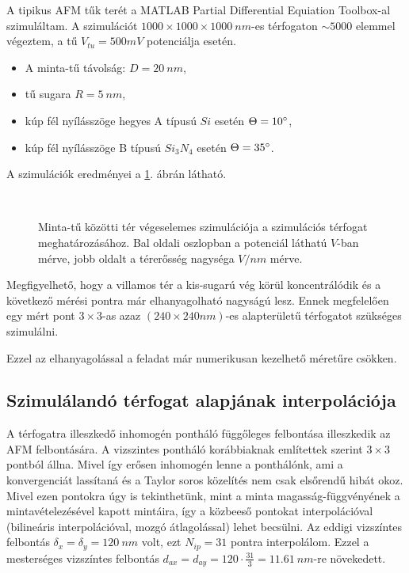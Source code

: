 	A tipikus AFM tűk terét a MATLAB Partial Differential Equiation Toolbox-al szimuláltam.
	A szimulációt $1000\times 1000\times 1000\ nm$-es térfogaton $\sim5000$ elemmel végeztem, a tű $V_{tu} = 500mV$ potenciálja
	esetén.
	\begin{itemize}
	  \item A minta-tű távolság: $D=20\ nm$,
	  \item tű sugara $R=5\ nm$,
	  \item kúp fél nyílásszöge hegyes A típusú $Si$ esetén $\Theta=10\degree$,
	  \item kúp fél nyílásszöge B típusú $Si_3N_4$ esetén $\Theta=35\degree$.
	\end{itemize}
	A szimulációk eredményei a \ref{fig:pde_sim}. ábrán látható.
	\begin{figure}[!h]
		\hfil
		\\
		\hfil
		
		\caption{
			Minta-tű közötti tér végeselemes szimulációja a szimulációs térfogat meghatározásához.
			Bal oldali oszlopban a potenciál láthatú $V$-ban mérve, jobb oldalt a térerősség nagységa $V/nm$ mérve.
		}
		\label{fig:pde_sim}
	\end{figure}
		
	Megfigyelhető, hogy a villamos tér a kis-sugarú vég körül koncentrálódik és a következő mérési pontra már elhanyagolható nagyságú
	lesz. Ennek megfelelően egy mért pont $3\times3$-as azaz $(240\times240 nm)$-es alapterületű térfogatot szükséges szimulálni. 
	\begin{center}
		Ezzel az elhanyagolással a feladat már numerikusan kezelhető méretűre csökken.
	\end{center}
	
\subsection{Szimulálandó térfogat alapjának interpolációja}	
	A térfogatra illeszkedő inhomogén pontháló függőleges felbontása illeszkedik az AFM felbontására.
	A vizszintes pontháló korábbiaknak említettek szerint $3\times3$ pontból állna.
	Mivel így erősen inhomogén lenne a ponthálónk, ami a konvergenciát lassítaná és a Taylor soros közelítés nem csak elsőrendű
	hibát okoz.
	Mivel ezen pontokra úgy is tekinthetünk, mint a minta magasság-függvényének a mintavételezésével
	kapott mintáira, így a közbeeső pontokat interpolációval (bilineáris interpolációval, mozgó átlagolással) lehet becsülni.
	Az eddigi vizszíntes felbontás $\delta_x = \delta_y = 120\ nm$ volt, ezt $N_{ip}=31$ pontra interpolálom.
	Ezzel a mesterséges vizszíntes felbontás $d_{ax} = d_{ay} = 120\cdot\frac{31}{3} = 11.61\ nm$-re növekedett.
	
